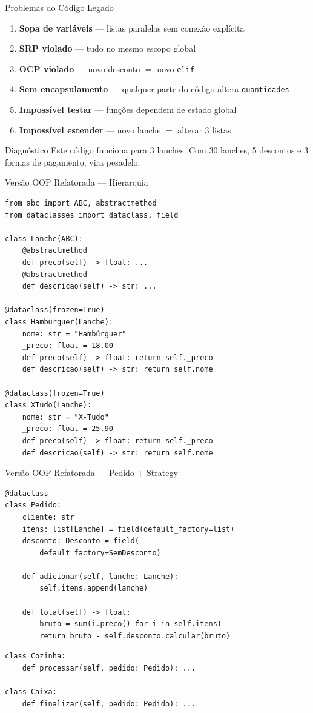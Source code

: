 \documentclass[aspectratio=169]{beamer}
\begin{document}
\begin{frame}{Problemas do Código Legado}
\begin{enumerate}
  \item \textbf{Sopa de variáveis} --- listas paralelas sem conexão explícita
  \item \textbf{SRP violado} --- tudo no mesmo escopo global
  \item \textbf{OCP violado} --- novo desconto $=$ novo \texttt{elif}
  \item \textbf{Sem encapsulamento} --- qualquer parte do código altera \texttt{quantidades}
  \item \textbf{Impossível testar} --- funções dependem de estado global
  \item \textbf{Impossível estender} --- novo lanche $=$ alterar 3 listas
\end{enumerate}

\begin{alertblock}{Diagnóstico}
Este código funciona para 3 lanches. Com 30 lanches, 5 descontos e 3 formas de pagamento, vira pesadelo.
\end{alertblock}
\end{frame}

\begin{frame}{Versão OOP Refatorada --- Hierarquia}
\begin{lstlisting}
from abc import ABC, abstractmethod
from dataclasses import dataclass, field

class Lanche(ABC):
    @abstractmethod
    def preco(self) -> float: ...
    @abstractmethod
    def descricao(self) -> str: ...

@dataclass(frozen=True)
class Hamburguer(Lanche):
    nome: str = "Hambúrguer"
    _preco: float = 18.00
    def preco(self) -> float: return self._preco
    def descricao(self) -> str: return self.nome

@dataclass(frozen=True)
class XTudo(Lanche):
    nome: str = "X-Tudo"
    _preco: float = 25.90
    def preco(self) -> float: return self._preco
    def descricao(self) -> str: return self.nome
\end{lstlisting}
\end{frame}

\begin{frame}{Versão OOP Refatorada --- Pedido + Strategy}
\begin{lstlisting}
@dataclass
class Pedido:
    cliente: str
    itens: list[Lanche] = field(default_factory=list)
    desconto: Desconto = field(
        default_factory=SemDesconto)

    def adicionar(self, lanche: Lanche):
        self.itens.append(lanche)

    def total(self) -> float:
        bruto = sum(i.preco() for i in self.itens)
        return bruto - self.desconto.calcular(bruto)
\end{lstlisting}

\begin{lstlisting}
class Cozinha:
    def processar(self, pedido: Pedido): ...

class Caixa:
    def finalizar(self, pedido: Pedido): ...
\end{lstlisting}
\end{frame}
\end{document}
